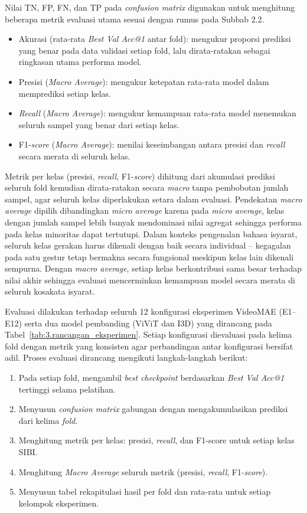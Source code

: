 Nilai TN, FP, FN, dan TP pada \textit{confusion matrix} digunakan untuk menghitung beberapa metrik evaluasi utama sesuai dengan rumus pada Subbab 2.2.

\begin{itemize}
    \item Akurasi (rata-rata \textit{Best Val Acc@1} antar fold): mengukur proporsi prediksi yang benar pada data validasi setiap fold, lalu dirata-ratakan sebagai ringkasan utama performa model.
    \item Presisi (\textit{Macro Average}): mengukur ketepatan rata-rata model dalam memprediksi setiap kelas.
    \item \textit{Recall} (\textit{Macro Average}): mengukur kemampuan rata-rata model menemukan seluruh sampel yang benar dari setiap kelas.
    \item F1-\textit{score} (\textit{Macro Average}): menilai keseimbangan antara presisi dan \textit{recall} secara merata di seluruh kelas.
\end{itemize}
Metrik per kelas (presisi, \textit{recall}, F1-\textit{score}) dihitung dari akumulasi prediksi seluruh fold kemudian dirata-ratakan secara \textit{macro} tanpa pembobotan jumlah sampel, agar seluruh kelas diperlakukan setara dalam evaluasi. Pendekatan \textit{macro average} dipilih dibandingkan \textit{micro average} karena pada \textit{micro average}, kelas dengan jumlah sampel lebih banyak mendominasi nilai agregat sehingga performa pada kelas minoritas dapat tertutupi. Dalam konteks pengenalan bahasa isyarat, seluruh kelas gerakan harus dikenali dengan baik secara individual -- kegagalan pada satu gestur tetap bermakna secara fungsional meskipun kelas lain dikenali sempurna. Dengan \textit{macro average}, setiap kelas berkontribusi sama besar terhadap nilai akhir sehingga evaluasi mencerminkan kemampuan model secara merata di seluruh kosakata isyarat.\par
Evaluasi dilakukan terhadap seluruh 12 konfigurasi eksperimen VideoMAE (E1--E12) serta dua model pembanding (ViViT dan I3D) yang dirancang pada Tabel~\ref{tab:3.rancangan_eksperimen}. Setiap konfigurasi dievaluasi pada kelima fold dengan metrik yang konsisten agar perbandingan antar konfigurasi bersifat adil. Proses evaluasi dirancang mengikuti langkah-langkah berikut:\par
\begin{enumerate}[noitemsep]
    \item Pada setiap fold, mengambil \textit{best checkpoint} berdasarkan \textit{Best Val Acc@1} tertinggi selama pelatihan.
    \item Menyusun \textit{confusion matrix} gabungan dengan mengakumulasikan prediksi dari kelima \textit{fold}.
    \item Menghitung metrik per kelas: presisi, \textit{recall}, dan F1-score untuk setiap kelas SIBI.
    \item Menghitung \textit{Macro Average} seluruh metrik (presisi, \textit{recall}, F1-\textit{score}).
    \item Menyusun tabel rekapitulasi hasil per fold dan rata-rata untuk setiap kelompok eksperimen.
\end{enumerate}
